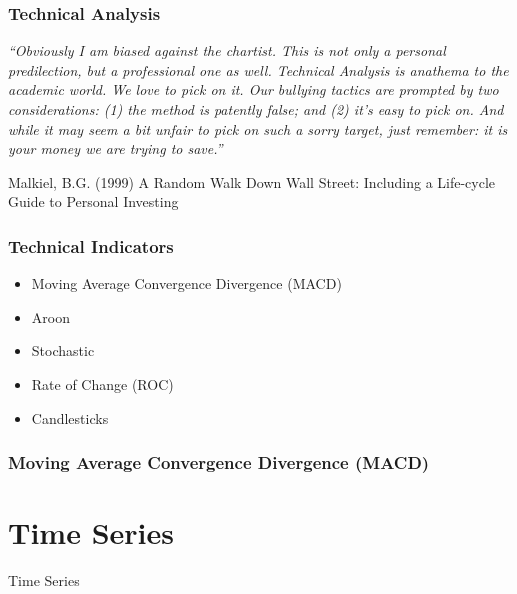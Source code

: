 \documentclass{beamer}
\begin{document}
\begin{frame}
\frametitle{Technical Analysis}

\textit{\textquotedblleft Obviously I am biased against the chartist. This is not only a personal predilection, but a professional one as well. Technical Analysis is anathema to the academic world. We love to pick on it. Our bullying tactics are prompted by two considerations: (1) the method is patently false; and (2) it's easy to pick on. And while it may seem a bit unfair to pick on such a sorry target, just remember: it is your money we are trying to save.\textquotedblright}
\begin{thebibliography}{99} %
 Malkiel, B.G. (1999)
\newblock A Random Walk Down Wall Street: Including a Life-cycle Guide to Personal Investing
\end{thebibliography}

\end{frame}

\begin{frame}
\frametitle{Technical Indicators}

\begin{itemize}
\item Moving Average Convergence Divergence (MACD)
\item Aroon
\item Stochastic
\item Rate of Change (ROC)
\item Candlesticks
\end{itemize}

\end{frame}

\begin{frame}
\frametitle{Moving Average Convergence Divergence (MACD)}


\end{frame}

\section{Time Series} %

\begin{frame}
\Huge{\centerline{Time Series}}
\end{frame}
\end{document}
